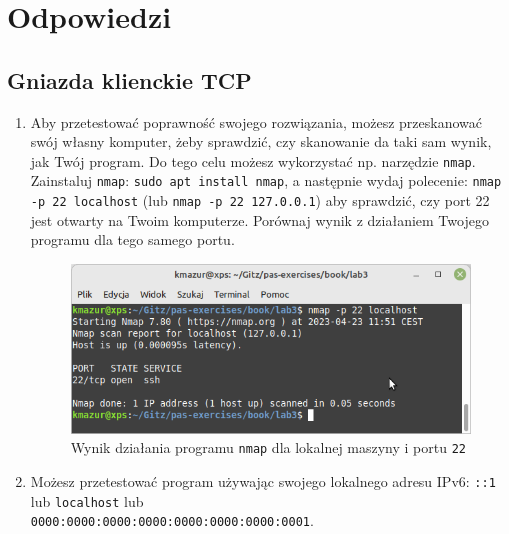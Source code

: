 \section{Odpowiedzi}

\subsection*{Gniazda klienckie TCP}
\begin{enumerate}[label=\textbf{3.\arabic*}]\setlength{\itemsep}{1em}
    \item    Aby przetestować poprawność swojego rozwiązania, możesz przeskanować swój własny komputer, żeby sprawdzić, czy skanowanie da taki sam wynik, jak Twój program. Do tego celu możesz wykorzystać np. narzędzie \texttt{nmap}. Zainstaluj \texttt{nmap}: \texttt{sudo apt install nmap}, a następnie wydaj polecenie: \texttt{nmap -p 22 localhost} (lub \texttt{nmap -p 22 127.0.0.1}) aby sprawdzić, czy port 22 jest otwarty na Twoim komputerze. Porównaj wynik z działaniem Twojego programu dla tego samego portu.  

\begin{figure}[h]
\caption{Wynik działania programu \texttt{nmap} dla lokalnej maszyny i portu \texttt{22}}
\centering
\includegraphics[scale=0.6]{./images/answers/ex3.1.png}
\end{figure}   

\item Możesz przetestować program używając swojego lokalnego adresu IPv6: \texttt{::1} lub \texttt{localhost} lub \\ \texttt{0000:0000:0000:0000:0000:0000:0000:0001}. 


\end{enumerate}
